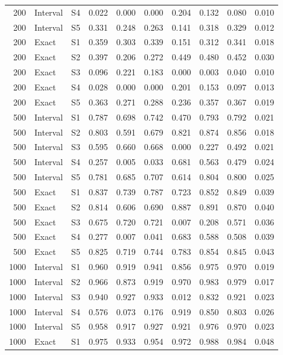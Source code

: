 \documentclass[12pt]{article}
\theoremstyle{definition}
\theoremstyle{remark}
\begin{document}
\begin{longtable}{rlcrrrrrrr}
200 & Interval & S4 & 0.022 & 0.000 & 0.000 & 0.204 & 0.132 & 0.080 & 0.010 \\
200 & Interval & S5 & 0.331 & 0.248 & 0.263 & 0.141 & 0.318 & 0.329 & 0.012 \\
200 & Exact & S1 & 0.359 & 0.303 & 0.339 & 0.151 & 0.312 & 0.341 & 0.018 \\
200 & Exact & S2 & 0.397 & 0.206 & 0.272 & 0.449 & 0.480 & 0.452 & 0.030 \\
200 & Exact & S3 & 0.096 & 0.221 & 0.183 & 0.000 & 0.003 & 0.040 & 0.010 \\
200 & Exact & S4 & 0.028 & 0.000 & 0.000 & 0.201 & 0.153 & 0.097 & 0.013 \\
200 & Exact & S5 & 0.363 & 0.271 & 0.288 & 0.236 & 0.357 & 0.367 & 0.019 \\
500 & Interval & S1 & 0.787 & 0.698 & 0.742 & 0.470 & 0.793 & 0.792 & 0.021 \\
500 & Interval & S2 & 0.803 & 0.591 & 0.679 & 0.821 & 0.874 & 0.856 & 0.018 \\
500 & Interval & S3 & 0.595 & 0.660 & 0.668 & 0.000 & 0.227 & 0.492 & 0.021 \\
500 & Interval & S4 & 0.257 & 0.005 & 0.033 & 0.681 & 0.563 & 0.479 & 0.024 \\
500 & Interval & S5 & 0.781 & 0.685 & 0.707 & 0.614 & 0.804 & 0.800 & 0.025 \\
500 & Exact & S1 & 0.837 & 0.739 & 0.787 & 0.723 & 0.852 & 0.849 & 0.039 \\
500 & Exact & S2 & 0.814 & 0.606 & 0.690 & 0.887 & 0.891 & 0.870 & 0.040 \\
500 & Exact & S3 & 0.675 & 0.720 & 0.721 & 0.007 & 0.208 & 0.571 & 0.036 \\
500 & Exact & S4 & 0.277 & 0.007 & 0.041 & 0.683 & 0.588 & 0.508 & 0.039 \\
500 & Exact & S5 & 0.825 & 0.719 & 0.744 & 0.783 & 0.854 & 0.845 & 0.043 \\
1000 & Interval & S1 & 0.960 & 0.919 & 0.941 & 0.856 & 0.975 & 0.970 & 0.019 \\
1000 & Interval & S2 & 0.966 & 0.873 & 0.919 & 0.970 & 0.983 & 0.979 & 0.017 \\
1000 & Interval & S3 & 0.940 & 0.927 & 0.933 & 0.012 & 0.832 & 0.921 & 0.023 \\
1000 & Interval & S4 & 0.576 & 0.073 & 0.176 & 0.919 & 0.850 & 0.803 & 0.026 \\
1000 & Interval & S5 & 0.958 & 0.917 & 0.927 & 0.921 & 0.976 & 0.970 & 0.023 \\
1000 & Exact & S1 & 0.975 & 0.933 & 0.954 & 0.972 & 0.988 & 0.984 & 0.048 \\

\end{longtable}
\end{document}
